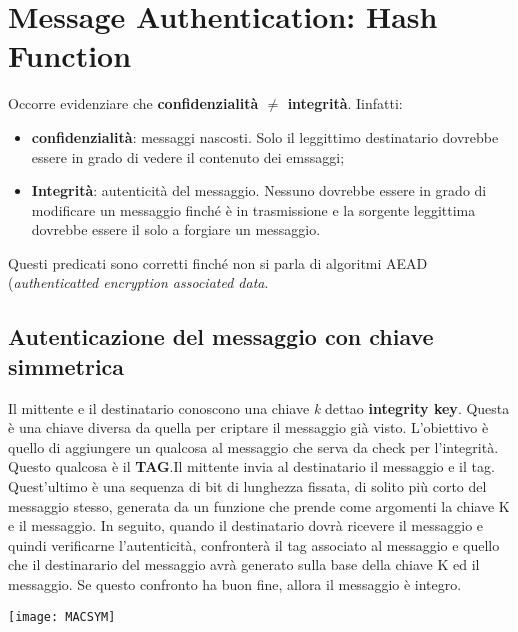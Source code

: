 \documentclass{article}
\theoremstyle{remark}
\begin{document}
\section{Message Authentication: Hash Function}
Occorre evidenziare che \textbf{confidenzialità $\neq$ integrità}. Iinfatti:
\begin{itemize}
    \item \textbf{confidenzialità}: messaggi nascosti. Solo il leggittimo destinatario dovrebbe essere in grado di vedere il contenuto dei emssaggi;
    \item \textbf{Integrità}: autenticità del messaggio. Nessuno dovrebbe essere in grado di modificare un messaggio finché è in trasmissione e la sorgente leggittima dovrebbe essere il solo a forgiare un messaggio.
\end{itemize}
Questi predicati sono corretti finché non si parla di algoritmi AEAD (\emph{authenticatted encryption associated data}.
\subsection{Autenticazione del messaggio con chiave simmetrica}
Il mittente e il destinatario conoscono una chiave \emph{k} dettao \textbf{integrity key}. Questa è una chiave diversa da quella per criptare il messaggio già visto.
L'obiettivo è quello di aggiungere un qualcosa al messaggio che serva da check per l'integrità. Questo qualcosa è il \textbf{TAG}.Il mittente invia al destinatario il messaggio e il tag. Quest'ultimo è una sequenza di bit di lunghezza fissata, di solito più corto del messaggio stesso, generata da un funzione che prende come argomenti la chiave K e il messaggio. In seguito, quando il destinatario dovrà ricevere il messaggio e quindi verificarne l'autenticità, confronterà il tag associato al messaggio e quello che il destinarario del messaggio avrà generato sulla base della chiave K ed il messaggio. Se questo confronto ha buon fine, allora il messaggio è integro.
\begin{center}
    \texttt{[image: MACSYM]}
\end{center}
\end{document}
